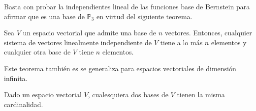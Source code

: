 \begin{frame}
\begin{solution}
        Basta con probar la independientes lineal de las funciones
        base de Bernstein para afirmar que es una base de
        $\mathbb{P}_3$ en virtud del siguiente teorema.

        \begin{theorem}
            Sea $V$ un espacio vectorial que admite una base de $n$
            vectores.
            Entonces, cualquier sistema de vectores linealmente
            independiente de $V$ tiene a lo más $n$ elementos y
            cualquier otra base de $V$ tiene $n$ elementos.
        \end{theorem}

        Este teorema también es se generaliza para espacios vectoriales de
        dimensión infinita.

        \begin{theorem}
            Dado un espacio vectorial $V$, cualesquiera dos bases de
            $V$ tienen la misma cardinalidad.
        \end{theorem}
    \end{solution}
\end{frame}